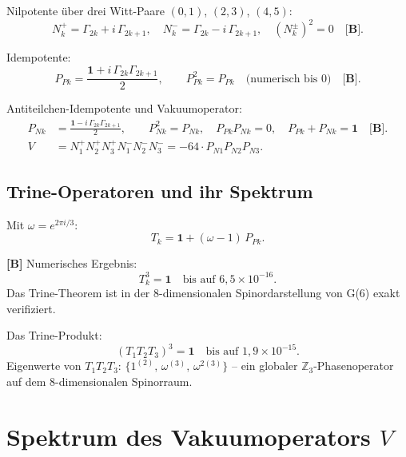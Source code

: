 Nilpotente über drei Witt-Paare $(0,1)$, $(2,3)$, $(4,5)$:
\begin{equation}
  N_k^+ = \Gamma_{2k} + i\,\Gamma_{2k+1}, \quad
  N_k^- = \Gamma_{2k} - i\,\Gamma_{2k+1}, \quad
  (N_k^\pm)^2 = 0 \quad \textbf{[B]}.
\end{equation}

Idempotente:
\begin{equation}
  P_{Pk} = \frac{\mathbf{1} + i\,\Gamma_{2k}\Gamma_{2k+1}}{2},
  \qquad P_{Pk}^2 = P_{Pk} \quad \text{(numerisch bis } 0\text{)} \quad \textbf{[B]}.
\end{equation}

Antiteilchen-Idempotente und Vakuumoperator:
\begin{align}
  P_{Nk} &= \frac{\mathbf{1} - i\,\Gamma_{2k}\Gamma_{2k+1}}{2},
  \qquad P_{Nk}^2 = P_{Nk},\quad P_{Pk}P_{Nk} = 0,\quad P_{Pk}+P_{Nk} = \mathbf{1} \quad \textbf{[B]}. \\
  V &= N_1^+N_2^+N_3^+N_1^-N_2^-N_3^- = -64\cdot P_{N1}P_{N2}P_{N3}.
  \label{eq:V_def}
\end{align}

\subsection{Trine-Operatoren und ihr Spektrum}

Mit $\omega = e^{2\pi i/3}$:
\begin{equation}
  T_k = \mathbf{1} + (\omega - 1)\,P_{Pk}.
  \label{eq:trine_def}
\end{equation}

\textbf{[B]} Numerisches Ergebnis:
\begin{equation}
  T_k^3 = \mathbf{1} \quad \text{bis auf } 6{,}5\times10^{-16}.
\end{equation}
Das Trine-Theorem ist in der 8-dimensionalen Spinordarstellung
von G(6) exakt verifiziert.

Das Trine-Produkt:
\begin{equation}
  (T_1 T_2 T_3)^3 = \mathbf{1} \quad \text{bis auf } 1{,}9\times10^{-15}.
\end{equation}
Eigenwerte von $T_1 T_2 T_3$: $\{1^{(2)},\, \omega^{(3)},\, \omega^{2(3)}\}$ --
ein globaler $\mathbb{Z}_3$-Phasenoperator auf dem 8-dimensionalen Spinorraum.

\section{Spektrum des Vakuumoperators $V$}

